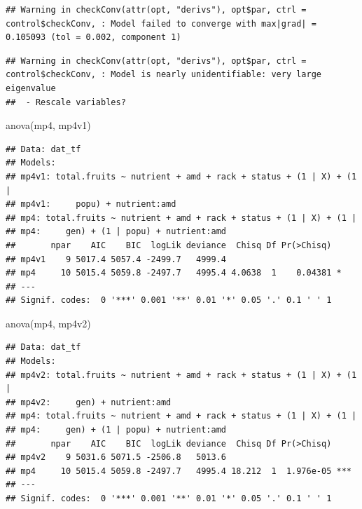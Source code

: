 \documentclass[
  12pt,
]{book}
\newenvironment{Shaded}{\begin{snugshade}}{\end{snugshade}}
\newcommand{\FunctionTok}[1]{\textcolor[rgb]{0.00,0.00,0.00}{#1}}
\newcommand{\NormalTok}[1]{#1}
\begin{document}
\begin{verbatim}
## Warning in checkConv(attr(opt, "derivs"), opt$par, ctrl = control$checkConv, : Model failed to converge with max|grad| = 0.105093 (tol = 0.002, component 1)
\end{verbatim}

\begin{verbatim}
## Warning in checkConv(attr(opt, "derivs"), opt$par, ctrl = control$checkConv, : Model is nearly unidentifiable: very large eigenvalue
##  - Rescale variables?
\end{verbatim}

\begin{Shaded}
\begin{Highlighting}[]
\FunctionTok{anova}\NormalTok{(mp4, mp4v1)}
\end{Highlighting}
\end{Shaded}

\begin{verbatim}
## Data: dat_tf
## Models:
## mp4v1: total.fruits ~ nutrient + amd + rack + status + (1 | X) + (1 | 
## mp4v1:     popu) + nutrient:amd
## mp4: total.fruits ~ nutrient + amd + rack + status + (1 | X) + (1 | 
## mp4:     gen) + (1 | popu) + nutrient:amd
##       npar    AIC    BIC  logLik deviance  Chisq Df Pr(>Chisq)  
## mp4v1    9 5017.4 5057.4 -2499.7   4999.4                       
## mp4     10 5015.4 5059.8 -2497.7   4995.4 4.0638  1    0.04381 *
## ---
## Signif. codes:  0 '***' 0.001 '**' 0.01 '*' 0.05 '.' 0.1 ' ' 1
\end{verbatim}

\begin{Shaded}
\begin{Highlighting}[]
\FunctionTok{anova}\NormalTok{(mp4, mp4v2)}
\end{Highlighting}
\end{Shaded}

\begin{verbatim}
## Data: dat_tf
## Models:
## mp4v2: total.fruits ~ nutrient + amd + rack + status + (1 | X) + (1 | 
## mp4v2:     gen) + nutrient:amd
## mp4: total.fruits ~ nutrient + amd + rack + status + (1 | X) + (1 | 
## mp4:     gen) + (1 | popu) + nutrient:amd
##       npar    AIC    BIC  logLik deviance  Chisq Df Pr(>Chisq)    
## mp4v2    9 5031.6 5071.5 -2506.8   5013.6                         
## mp4     10 5015.4 5059.8 -2497.7   4995.4 18.212  1  1.976e-05 ***
## ---
## Signif. codes:  0 '***' 0.001 '**' 0.01 '*' 0.05 '.' 0.1 ' ' 1
\end{verbatim}
\end{document}
